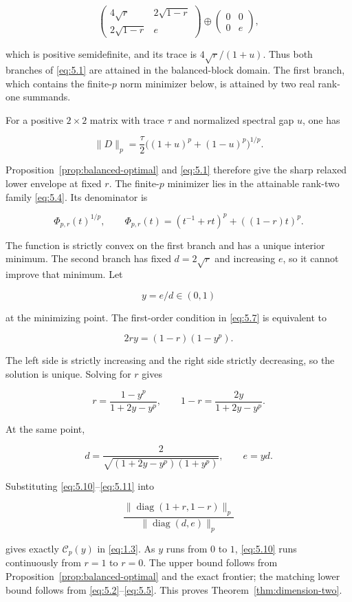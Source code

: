 \documentclass[11pt]{article}
\begin{document}
\[
\begin{pmatrix}4\sqrt r&2\sqrt{1-r}\\2\sqrt{1-r}&e\end{pmatrix}
\oplus
\begin{pmatrix}0&0\\0&e\end{pmatrix},
\]

which is positive semidefinite, and its trace is $4\sqrt r/(1+u)$. Thus both
branches of \eqref{eq:5.1} are attained in the balanced-block domain. The first branch,
which contains the finite-$p$ norm minimizer below, is attained by two real
rank-one summands.

For a positive $2\times2$ matrix with trace $\tau$ and normalized spectral gap
$u$, one has

\[
\|D\|_p=\frac\tau2
\bigl((1+u)^p+(1-u)^p\bigr)^{1/p}.
\tag{5.6}\label{eq:5.6}
\]

Proposition~\ref{prop:balanced-optimal} and \eqref{eq:5.1} therefore give the sharp relaxed lower envelope at fixed
$r$. The finite-$p$ minimizer lies in the attainable rank-two family \eqref{eq:5.4}. Its
denominator is

\[
\Phi_{p,r}(t)^{1/p},
\qquad
\Phi_{p,r}(t)=(t^{-1}+rt)^p+((1-r)t)^p.
\tag{5.7}\label{eq:5.7}
\]

The function is strictly convex on the first branch and has a unique interior
minimum. The second branch has fixed $d=2\sqrt r$ and increasing $e$, so it cannot
improve that minimum. Let

\[
y=e/d\in(0,1)
\tag{5.8}\label{eq:5.8}
\]

at the minimizing point. The first-order condition in \eqref{eq:5.7} is equivalent to

\[
2ry=(1-r)(1-y^p).
\tag{5.9}\label{eq:5.9}
\]

The left side is strictly increasing and the right side strictly decreasing, so
the solution is unique. Solving for $r$ gives

\[
r=\frac{1-y^p}{1+2y-y^p},\qquad
1-r=\frac{2y}{1+2y-y^p}.
\tag{5.10}\label{eq:5.10}
\]

At the same point,

\[
d=\frac{2}{\sqrt{(1+2y-y^p)(1+y^p)}},
\qquad e=yd.
\tag{5.11}\label{eq:5.11}
\]

Substituting \eqref{eq:5.10}--\eqref{eq:5.11} into

\[
\frac{\|\operatorname{diag}(1+r,1-r)\|_p}
{\|\operatorname{diag}(d,e)\|_p}
\]

gives exactly $\mathcal C_p(y)$ in \eqref{eq:1.3}. As $y$ runs from $0$ to $1$,
\eqref{eq:5.10} runs continuously from $r=1$ to $r=0$. The upper bound follows from
Proposition~\ref{prop:balanced-optimal} and the exact frontier; the matching lower bound follows from
\eqref{eq:5.2}--\eqref{eq:5.5}. This proves Theorem~\ref{thm:dimension-two}.
\end{document}
